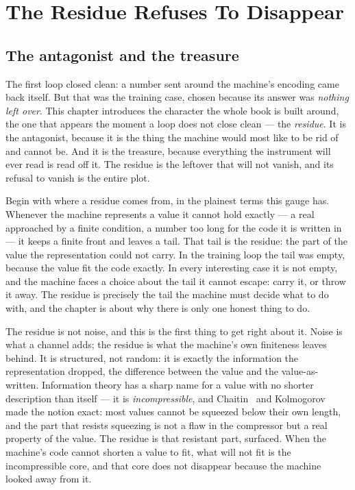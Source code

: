 \chapter{The Residue Refuses To Disappear}

\section{The antagonist and the treasure}

The first loop closed clean: a number sent around the machine's encoding came back itself. But that was the training
case, chosen because its answer was \emph{nothing left over}. This chapter introduces the character the whole book is
built around, the one that appears the moment a loop does not close clean --- the \emph{residue}. It is the antagonist,
because it is the thing the machine would most like to be rid of and cannot be. And it is the treasure, because
everything the instrument will ever read is read off it. The residue is the leftover that will not vanish, and its
refusal to vanish is the entire plot.

Begin with where a residue comes from, in the plainest terms this gauge has. Whenever the machine represents a value it
cannot hold exactly --- a real approached by a finite condition, a number too long for the code it is written in --- it
keeps a finite front and leaves a tail. That tail is the residue: the part of the value the representation could not
carry. In the training loop the tail was empty, because the value fit the code exactly. In every interesting case it is
not empty, and the machine faces a choice about the tail it cannot escape: carry it, or throw it away. The residue is
precisely the tail the machine must decide what to do with, and the chapter is about why there is only one honest thing
to do.

The residue is not noise, and this is the first thing to get right about it. Noise is what a channel adds; the residue
is what the machine's own finiteness leaves behind. It is structured, not random: it is exactly the information the
representation dropped, the difference between the value and the value-as-written. Information theory has a sharp name
for a value with no shorter description than itself --- it is \emph{incompressible}, and Chaitin~\cite{chaitin1974} and
Kolmogorov~\cite{kolmogorov1965} made the notion exact: most values cannot be squeezed below their own length, and the
part that resists squeezing is not a flaw in the compressor but a real property of the value. The residue is that
resistant part, surfaced. When the machine's code cannot shorten a value to fit, what will not fit is the incompressible
core, and that core does not disappear because the machine looked away from it.

